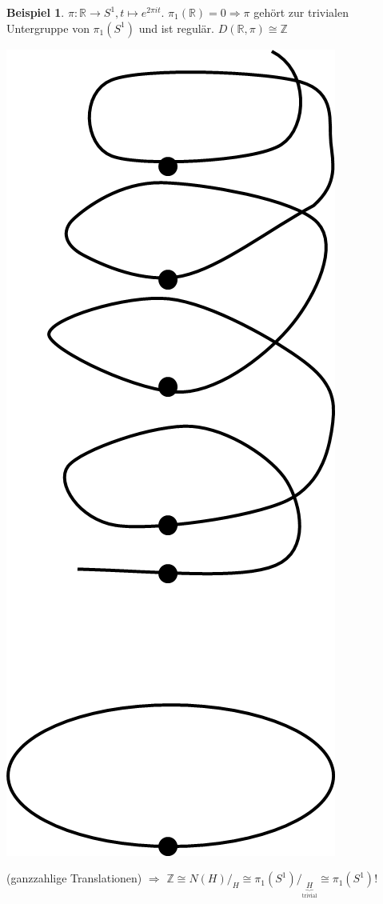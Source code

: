 \documentclass[a4paper,11pt,notitlepage]{report}
\theoremstyle{definition}
\newtheorem{example}{Beispiel}[chapter]
\newcommand{\R}{{\ensuremath{\mathbb{R}}}}
\newcommand{\Z}{{\ensuremath{\mathbb{Z}}}}
\begin{document}
\begin{example}
	$\pi \colon \R \rightarrow S^1, t \mapsto e^{2 \pi i t}$.
	\newline
	$\pi_1(\R) = 0 \Rightarrow \pi$ gehört zur trivialen Untergruppe von $\pi_1(S^1)$ und ist regulär. $D(\R,\pi) \cong \Z$ \begin{center}
	 	\includegraphics[scale=0.5]{images/2011_12_22_Bild8.png}
	 \end{center}
	(ganzzahlige Translationen) $\Rightarrow$
	\newline
	$\Z \cong N(H)/_H \cong \pi_1(S^1)/_{\underbrace{H}_{\text{trivial}}} \cong \pi_1(S^1) !$
\end{example}
\end{document}
